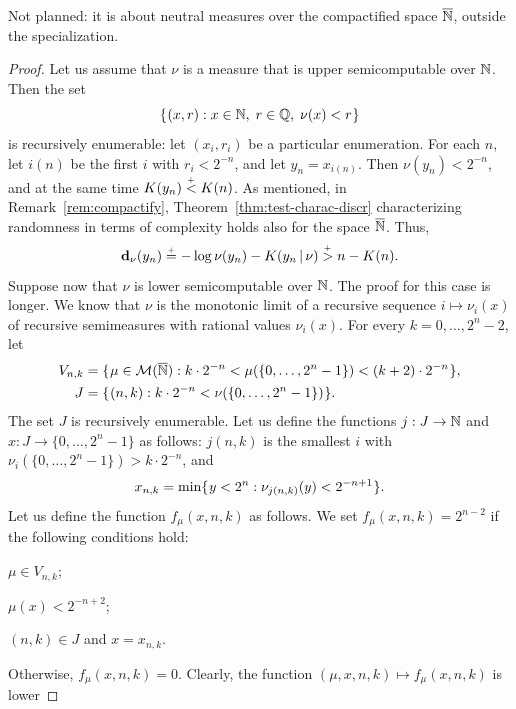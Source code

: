 \begin{formalization}
Not planned: it is about neutral measures over the compactified space $\overline{\mathbb{N}}$, outside the
specialization.
\end{formalization}
 \begin{proof}
  \notready
Let us assume that \( \nu \) is a measure that is upper semicomputable over
\( \mathbb{N} \).
Then the set
 \[
   \mathopen\{\mskip 1mu(x,r) : x \in\mathbb{N},\; r\in\mathbb{Q},\; \nu(x) < r\mskip 1mu\mathclose\}
 \]
is recursively enumerable: let \( (x_{i},r_{i}) \) be a particular
enumeration. 
For each \( n \), let \( i(n) \) be the first \( i \) with \( r_{i} < 2^{-n} \), and let
\( y_{n} = x_{i(n)} \).
Then \( \nu(y_{n}) < 2^{-n} \), and at the same time \( K(y_{n}) \stackrel{{}_+}{<} K(n) \).
As mentioned, in Remark~\ref{rem:compactify}, 
Theorem~\ref{thm:test-charac-discr} characterizing randomness in terms of
complexity holds also for the space \( \overline{\mathbb{N}} \).
Thus, 
 \[
  \mathbf{d}_{\nu}(y_{n}) \stackrel{{}_+}{=} -\log\nu(y_{n}) - K(y_{n} \,\vert\, \nu) \stackrel{{}_+}{>} n - K(n).
 \]
Suppose now that \( \nu \) is lower semicomputable over \( \mathbb{N} \).
The proof for this case is longer.
We know that \( \nu \) is the monotonic limit of a recursive sequence
\( i\mapsto \nu_{i}(x) \) of recursive semimeasures with rational values
\( \nu_{i}(x) \).
For every \( k=0,\dots,2^{n}-2 \), let 
 \begin{align*}
  V_{n,k} &= \mathopen\{\mskip 1mu\mu \in \mathcal{M}(\overline{\mathbb{N}}) : 
k\cdot 2^{-n} < \mu(\{0,\dots,2^{n}-1\}) < (k+2)\cdot 2^{-n}\mskip 1mu\mathclose\},
\\       J &= \mathopen\{\mskip 1mu(n,k): k\cdot 2^{-n} < \nu(\{0,\dots,2^{n}-1\})\mskip 1mu\mathclose\}.
 \end{align*}
The set \( J \) is recursively enumerable.
Let us define the functions \( j:J\to\mathbb{N} \) and \( x:J\to\{0,\dots,2^{n}-1\} \)
as follows: \( j(n,k) \) is the smallest \( i \) with 
\( \nu_{i}(\{0,\dots,2^{n}-1\}) > k\cdot 2^{-n} \), and
 \[
   x_{n,k} = \min\mathopen\{\mskip 1mu y < 2^{n}: \nu_{j(n,k)}(y) < 2^{-n+1}\mskip 1mu\mathclose\}.
 \]
Let us define the function \( f_{\mu}(x,n,k) \) as follows.
We set \( f_{\mu}(x,n,k)=2^{n-2} \) if the following conditions hold:
 \begin{alphenum}
  \item\label{i:no-upper-semi-neutral.mu-global} \( \mu \in V_{n,k} \);
  \item\label{i:no-upper-semi-neutral.mu-upper} \( \mu(x) < 2^{-n+2} \);
  \item\label{i:no-upper-semi-neutral.unique}
 \( (n,k) \in J \) and \( x=x_{n,k} \).
 \end{alphenum}
Otherwise, \( f_{\mu}(x,n,k)=0 \).
Clearly, the function \( (\mu,x,n,k) \mapsto f_{\mu}(x,n,k) \) is lower

\end{proof}
